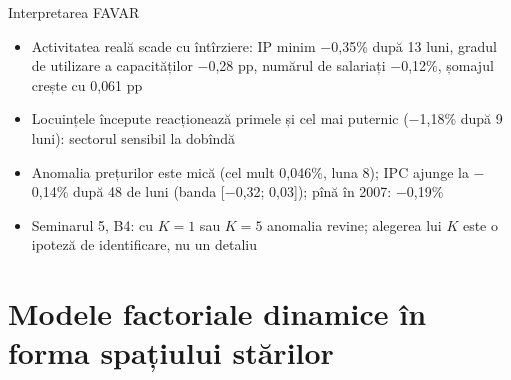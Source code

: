 \begin{frame}{Interpretarea FAVAR}
\itemsize{\small}
\begin{itemize}
    \item Activitatea reală scade cu întîrziere: IP minim \ensuremath{-}0{,}35\% după 13 luni, gradul de utilizare a capacităților \ensuremath{-}0{,}28 pp, numărul de salariați \ensuremath{-}0{,}12\%, șomajul crește cu 0{,}061 pp
    \item Locuințele începute reacționează primele și cel mai puternic (\ensuremath{-}1{,}18\% după 9 luni): sectorul sensibil la dobîndă
    \item Anomalia prețurilor este mică (cel mult 0{,}046\%, luna 8); IPC ajunge la \ensuremath{-}0{,}14\% după 48 de luni (banda [\ensuremath{-}0{,}32; 0{,}03]); pînă în 2007: \ensuremath{-}0{,}19\%
    \item Seminarul 5, B4: cu $K = 1$ sau $K = 5$ anomalia revine; alegerea lui $K$ este o ipoteză de identificare, nu un detaliu
\end{itemize}
\end{frame}


\section{Modele factoriale dinamice în forma spațiului stărilor}

